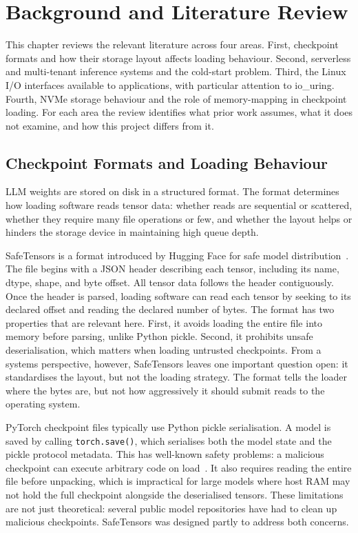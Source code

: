 \chapter{Background and Literature Review}
\label{chap:background}

This chapter reviews the relevant literature across four areas. First, checkpoint formats and how their storage layout affects loading behaviour. Second, serverless and multi-tenant inference systems and the cold-start problem. Third, the Linux I/O interfaces available to applications, with particular attention to io\_uring. Fourth, NVMe storage behaviour and the role of memory-mapping in checkpoint loading. For each area the review identifies what prior work assumes, what it does not examine, and how this project differs from it.

\section{Checkpoint Formats and Loading Behaviour}

LLM weights are stored on disk in a structured format. The format determines how loading software reads tensor data: whether reads are sequential or scattered, whether they require many file operations or few, and whether the layout helps or hinders the storage device in maintaining high queue depth.

SafeTensors is a format introduced by Hugging Face for safe model distribution~\cite{safetensors_docs}. The file begins with a JSON header describing each tensor, including its name, dtype, shape, and byte offset. All tensor data follows the header contiguously. Once the header is parsed, loading software can read each tensor by seeking to its declared offset and reading the declared number of bytes. The format has two properties that are relevant here. First, it avoids loading the entire file into memory before parsing, unlike Python pickle. Second, it prohibits unsafe deserialisation, which matters when loading untrusted checkpoints. From a systems perspective, however, SafeTensors leaves one important question open: it standardises the layout, but not the loading strategy. The format tells the loader where the bytes are, but not how aggressively it should submit reads to the operating system.

PyTorch checkpoint files typically use Python pickle serialisation. A model is saved by calling \texttt{torch.save()}, which serialises both the model state and the pickle protocol metadata. This has well-known safety problems: a malicious checkpoint can execute arbitrary code on load~\cite{safetensors_docs}. It also requires reading the entire file before unpacking, which is impractical for large models where host RAM may not hold the full checkpoint alongside the deserialised tensors. These limitations are not just theoretical: several public model repositories have had to clean up malicious checkpoints. SafeTensors was designed partly to address both concerns.

